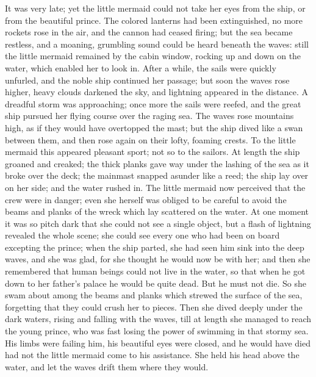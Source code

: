 It was very late; yet the little mermaid could not take her eyes from the ship, or from the beautiful prince.
The colored lanterns had been extinguished, no more rockets rose in the air, and the cannon had ceased firing; but the sea became restless, and a moaning, grumbling sound could be heard beneath the waves: still the little mermaid remained by the cabin window, rocking up and down on the water, which enabled her to look in.
After a while, the sails were quickly unfurled, and the noble ship continued her passage; but soon the waves rose higher, heavy clouds darkened the sky, and lightning appeared in the distance.
A dreadful storm was approaching; once more the sails were reefed, and the great ship pursued her flying course over the raging sea.
The waves rose mountains high, as if they would have overtopped the mast; but the ship dived like a swan between them, and then rose again on their lofty, foaming crests.
To the little mermaid this appeared pleasant sport; not so to the sailors.
At length the ship groaned and creaked; the thick planks gave way under the lashing of the sea as it broke over the deck; the mainmast snapped asunder like a reed; the ship lay over on her side; and the water rushed in.
The little mermaid now perceived that the crew were in danger; even she herself was obliged to be careful to avoid the beams and planks of the wreck which lay scattered on the water.
At one moment it was so pitch dark that she could not see a single object, but a flash of lightning revealed the whole scene; she could see every one who had been on board excepting the prince; when the ship parted, she had seen him sink into the deep waves, and she was glad, for she thought he would now be with her; and then she remembered that human beings could not live in the water, so that when he got down to her father’s palace he would be quite dead.
But he must not die.
So she swam about among the beams and planks which strewed the surface of the sea, forgetting that they could crush her to pieces.
Then she dived deeply under the dark waters, rising and falling with the waves, till at length she managed to reach the young prince, who was fast losing the power of swimming in that stormy sea.
His limbs were failing him, his beautiful eyes were closed, and he would have died had not the little mermaid come to his assistance.
She held his head above the water, and let the waves drift them where they would.

